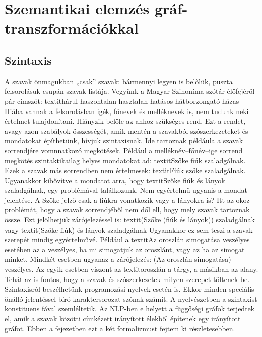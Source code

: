 \chapter{Szemantikai elemzés gráf-transzformációkkal}
\label{sec:SemParsWithGraphTrans}
\section{Szintaxis}
A szavak önmagukban „csak” szavak: bármennyi legyen is belőlük, puszta felsorolásuk csupán szavak listája.
Vegyünk a Magyar Szinoníma szótár élőfejéről pár címszót: textit{hárul haszontalan hasztalan hatásos hátborzongató házas}
Hiába vannak a felsorolásban igék, főnevek és melléknevek is, nem tudunk neki értelmet tulajdonítani.
Hiányzik belőle az ahhoz szükséges rend.
Ezt a rendet, avagy azon szabályok összességét, amik mentén a szavakból szószerkezeteket és mondatokat építhetünk, hívjuk szintaxisnak.
Ide tartoznak példáula a szavak sorrendjére vomnnatkozó megkötések.
Például a melléknév–főnév–ige sorrend megkötés szintaktikailag helyes mondatokat ad: textit{Szőke fiúk szaladgálnak}.
Ezek a szavak más sorrendben nem értelmesek: textit{Fiúk szőke szaladgálnak}. 
Ugyanakkor kibővítve a mondatot arra, hogy textit{Szőke fiúk és lányok szaladgálnak}, egy problémával találkozunk.
Nem egyértelmű ugyanis a mondat jelentése.
A Szőke jelző csak a fiúkra vonatkozik vagy a lányokra is?
Itt az okoz problémát, hogy a szavak sorrendjéből nem dől ell, hogy mely szavak tartoznak össze.
Ezt jelölhetjük zárójelezéssel is: textit{(Szőke (fiúk és lányok)) szaladgálnak} vagy textit{(Szőke fiúk) és lányok szaladgálnak}
Ugyanakkor ez sem teszi a szavak szerepét mindig egyértelművé. 
Például a textit{Az oroszlán simogatása veszélyes} esetében az a veszélyes, ha mi simogatjuk az oroszlánt, vagy az ha az simogat minket.
Mindkét esetben ugyanaz a zárójelezés: (Az oroszlán simogatása) veszélyes.
Az egyik esetben viszont az textit{oroszlán} a tárgy, a másikban az alany.
Tehát az is fontos, hogy a szavak és szószerkezetek milyen szerepet töltenek be.
Szintaxisról beszélhetünk programozási nyelvek esetén is.
Ekkor minden speciális önálló jelentéssel bíró karaktersorozat szónak számít.
A nyelvészetben a szintaxist konstituens fával szemléltetik.
Az NLP-ben e helyett a függőségi gráfok terjedtek el, amik a szavak közötti címkézett irányított élekből építenek egy irányított gráfot. 
Ebben a fejezetben ezt a két formalizmust fejtem ki részletesebben.

